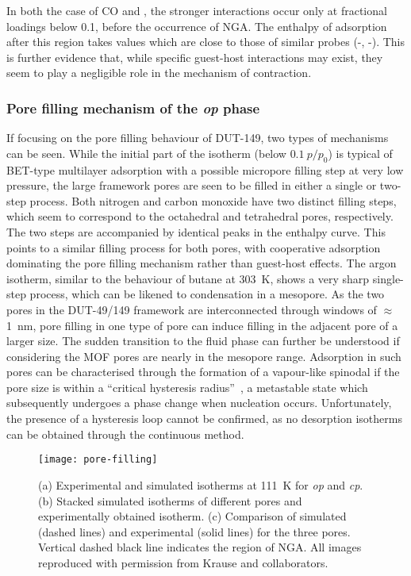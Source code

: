 In both the case of CO and , the 
stronger interactions occur only at fractional loadings below 0.1, 
before the occurrence of \gls{NGA}. The enthalpy of 
adsorption after this region takes values which are close to
those of similar probes (-, -).
This is further evidence that, while specific guest-host interactions
may exist, they seem to play a negligible role in the mechanism of contraction.

\subsubsection{Pore filling mechanism of the \textit{op} phase}

If focusing on the pore filling behaviour of DUT-149, two types
of mechanisms can be seen. While the initial part of the isotherm 
(below \(0.1~p/p_0\)) is typical of \gls{BET}-type multilayer adsorption
with a possible micropore filling step at very low pressure,
the large framework pores are seen to be filled in either a single or
two-step process.
Both nitrogen and carbon monoxide have two distinct filling
steps, which seem to correspond to the octahedral and tetrahedral pores,
respectively. The two steps are accompanied by identical 
peaks in the enthalpy curve. This points to a similar 
filling process for both pores, with cooperative adsorption
dominating the pore filling mechanism rather than guest-host 
effects. The argon isotherm, similar to the behaviour of 
butane at \SI{303}{\kelvin}, shows a very sharp single-step process,
which can be likened to condensation in a mesopore. As the 
two pores in the DUT-49/149 framework are interconnected through 
windows of \(\approx\)\SI{1}{\nano\metre}, pore filling 
in one type of pore can induce filling in the adjacent pore of 
a larger size. The sudden transition to the fluid phase can further
be understood if considering the \gls{MOF} pores are nearly in the mesopore 
range. Adsorption in such pores can be characterised through 
the formation of a vapour-like spinodal if the pore size is within
a ``critical hysteresis radius''~\cite{hiratsukaCriticalEnergyBarrier2016},
a metastable state which subsequently undergoes a phase change when
nucleation occurs. Unfortunately, the presence of a hysteresis loop
cannot be confirmed, as no desorption isotherms can be obtained 
through the continuous method.

\begin{figure}[b]
	\centering
	\texttt{[image: pore-filling]}%
    \caption{
        (a) Experimental and simulated  isotherms at 
        \SI{111}{\kelvin} for \textit{op} and \textit{cp}. 
        (b) Stacked simulated isotherms of different pores and 
        experimentally obtained isotherm.
        (c) Comparison of simulated (dashed lines) and experimental
        (solid lines) for the three pores.
        Vertical dashed black line indicates the region of \gls{NGA}.
        All images reproduced with permission from Krause and collaborators.
    }\label{dut:fig:pore-filling}
\end{figure}

